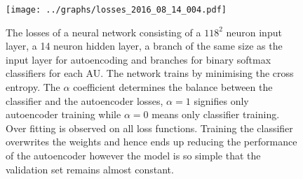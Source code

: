     \begin{figure}[!h]
    \centering
    \texttt{[image: ../graphs/losses\_2016\_08\_14\_004.pdf]}
    \caption{The losses of a neural network consisting of a $118^2$ neuron input layer, a 14
    neuron hidden layer, a branch of the same size as the input layer for autoencoding
    and branches for binary softmax classifiers for each AU. The network trains by minimising
    the cross entropy. The $\alpha$ coefficient determines the balance between the
    classifier and the autoencoder losses, $\alpha=1$ signifies only autoencoder training
    while $\alpha=0$ means only classifier training. Over fitting is observed
    on all loss functions. Training the classifier
    overwrites the weights and hence ends up reducing
    the performance of the autoencoder however the
    model is so simple that the validation set remains almost constant.}
    \label{fig:simple}
    \end{figure}

